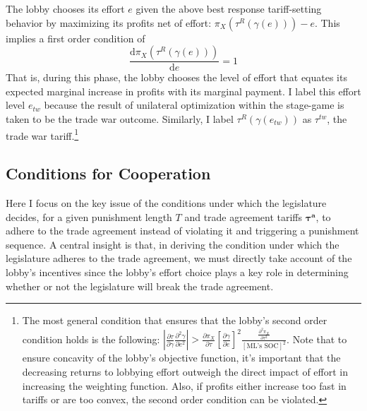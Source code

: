 \documentclass[authoryear, review]{elsarticle}
\newcommand{\bta}{\bm{\tau^a}}
\newcommand{\ga}{\gamma}
\begin{document}
The lobby chooses its effort $e$ given the above best response tariff-setting behavior by maximizing its profits net of effort: $\pi_X\left(\tau^R\left(\ga\left(e\right)\right)\right) - e$. This implies a first order condition of
\begin{equation}
	\frac{\mathrm{d} \pi_X(\tau^R(\ga(e)))}{\mathrm{d} e} = 1
  \label{eq:lobtw}
\end{equation}
That is, during this phase, the lobby chooses the level of effort that equates its expected marginal increase in profits with its marginal payment. I label this effort level $e_{tw}$ because the result of unilateral optimization within the stage-game is taken to be the trade war outcome. Similarly, I label $\tau^R(\ga(e_{tw}))$ as $\tau^{tw}$, the trade war tariff.\footnote{The most general condition that ensures that the lobby's second order condition holds is the following: $\left| \frac{\partial \tau}{\partial \ga}\frac{\partial^2 \ga}{\partial e^2}\right|>\frac{\partial \pi_X}{\partial \tau}\left[\frac{\partial \ga}{\partial e}\right]^2\frac{\frac{\partial^2 \pi_X}{\partial \tau^2}}{\left[\text{ML's SOC}\right]^2}$. Note that to ensure concavity of the lobby's objective function, it's important that the decreasing returns to lobbying effort outweigh the direct impact of effort in increasing the weighting function. Also, if profits either increase too fast in tariffs or are too convex, the second order condition can be violated.\label{fn:lobsoc}}

\subsection{Conditions for Cooperation}
\label{sec:coop}
Here I focus on the key issue of the conditions under which the legislature decides, for a given punishment length $T$ and trade agreement tariffs $\bta$, to adhere to the trade agreement instead of violating it and triggering a punishment sequence. A central insight is that, in deriving the condition under which the legislature adheres to the trade agreement, we must directly take account of the lobby's incentives since the lobby's effort choice plays a key role in determining whether or not the legislature will break the trade agreement. 
\end{document}
